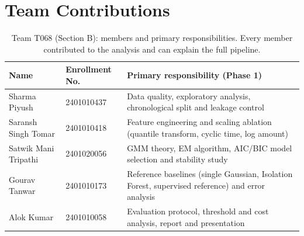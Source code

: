\documentclass[12pt]{article}
\begin{document}
\section{Team Contributions}
\begin{table}[H]
\centering\small
\caption{Team T068 (Section B): members and primary responsibilities. Every member contributed to the analysis and
can explain the full pipeline.}
\begin{tabularx}{\linewidth}{@{}l l X@{}}
\toprule
\textbf{Name} & \textbf{Enrollment No.} & \textbf{Primary responsibility (Phase 1)}\\
\midrule
Sharma Piyush & 2401010437 & Data quality, exploratory analysis, chronological split and leakage control\\
Saransh Singh Tomar & 2401010418 & Feature engineering and scaling ablation (quantile transform, cyclic time, log amount)\\
Satwik Mani Tripathi & 2401020056 & GMM theory, EM algorithm, AIC/BIC model selection and stability study\\
Gourav Tanwar & 2401010173 & Reference baselines (single Gaussian, Isolation Forest, supervised reference) and error analysis\\
Alok Kumar & 2401010058 & Evaluation protocol, threshold and cost analysis, report and presentation\\
\bottomrule
\end{tabularx}
\end{table}
\end{document}
